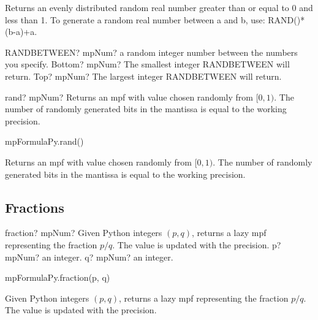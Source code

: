 \vspace{0.3cm}
Returns an evenly distributed random real number greater than or equal to 0 and less than 1. 
To generate a random real number between a and b, use: RAND()*(b-a)+a.


\vspace{0.6cm}

\begin{mpFunctionsExtract}
	\mpWorksheetFunctionTwoNotImplemented
	{RANDBETWEEN? mpNum?  a random integer number between the numbers you specify.}
	{Bottom? mpNum? The smallest integer RANDBETWEEN will return.}
	{Top? mpNum? The largest integer RANDBETWEEN will return.}
\end{mpFunctionsExtract}





\begin{mpFunctionsExtract}
	\mpFunctionZero
	{rand? mpNum? Returns an mpf with value chosen randomly from $[0,1)$. The number of randomly generated bits in the mantissa is equal to the working precision.}
\end{mpFunctionsExtract}


mpFormulaPy.rand()

\vpara
Returns an mpf with value chosen randomly from $[0,1)$. The number of randomly generated bits in the mantissa is equal to the working precision.




\subsection{Fractions}


\begin{mpFunctionsExtract}
	\mpFunctionTwo
	{fraction? mpNum?  Given Python integers $(p,q)$, returns a lazy mpf representing the fraction $p/q$. The value is updated with the precision.}
	{p? mpNum? an integer.}
	{q? mpNum? an integer.}
\end{mpFunctionsExtract}


mpFormulaPy.fraction(p, q)

\vpara
Given Python integers $(p,q)$, returns a lazy mpf representing the fraction $p/q$. The value is updated with the precision.

